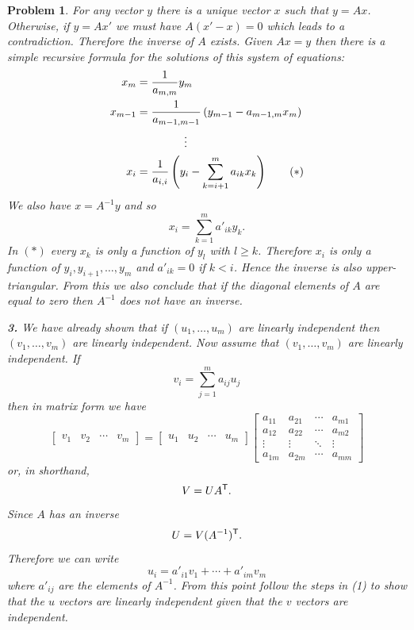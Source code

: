 \documentclass{article}
\theoremstyle{pprop}
\newtheorem{problem}{Problem}[section]
\begin{document}
\begin{problem}
For any vector $y$ there is a unique vector $x$ such that $y=Ax$. Otherwise, if $y=Ax'$ we must have $A(x'-x)=0$ 
which leads to a contradiction. Therefore the inverse of $A$ exists.
Given $Ax=y$ then there is a simple recursive formula for the solutions of this system of equations:
\begin{align*}
x_m &= \frac{1}{a_{m,m}}y_m \\
x_{m-1} & =\frac{1}{a_{m-1,m-1}} \left( y_{m-1}-a_{m-1,m} x_m \right) \\
& \kern10ex\vdots   \\
x_{i} &= \frac{1}{a_{i,i}} \left( y_i -  \sum_{k=i+1}^m a_{ik} x_k\right) \tag{$\ast$}
\end{align*}
We also have $x=A^{-1}y$ and so
$$
x_i = \sum_{k=1}^m a'_{ik} y_k.
$$
In $(\ast)$ every $x_k$ is only a function of $y_l$ with $l \geq k$. Therefore $x_i$ is only a function of 
$y_i, y_{i+1}, \ldots, y_m$ and $a'_{ik}=0$ if $k<i$. Hence the inverse is also upper-triangular. From this we also 
conclude that if the diagonal elements of $A$ are equal to zero then $A^{-1}$ does not have an inverse.
\par\noindent\textbf{3.} We have already shown that if $(u_1,\ldots,u_m)$ are linearly independent then $(v_1,\ldots,v_m)$ are 
linearly independent. Now assume that $(v_1,\ldots,v_m)$ are linearly independent. If 
$$
v_i = \sum_{j=1}^m a_{ij} u_j
$$
then in matrix form we have 
$$
\left[
\begin{array}{c|c|c|c} 
v_1 & v_2 & \cdots & v_m
\end{array}
\right]=
\left[
\begin{array}{c|c|c|c} 
u_1 & u_2 & \cdots & u_m
\end{array}
\right]
\begin{bmatrix}
a_{11} & a_{21} & \cdots & a_{m1} \\
a_{12} & a_{22} & \cdots & a_{m2}\\
\vdots & \vdots & \ddots & \vdots\\
a_{1m} & a_{2m} & \cdots & a_{mm}
\end{bmatrix}
$$
or, in shorthand,
$$
V = U A^{\sf T}.
$$
Since $A$ has an inverse 
$$
U = V (A^{-1})^{\sf T}.
$$
Therefore we can write 
$$
u_i = a'_{i1} v_1 + \cdots + a'_{im} v_m
$$
where $a'_{ij}$ are the elements of $A^{-1}$. From this point follow the steps in (1) to show that the $u$ vectors are 
linearly independent given that the $v$ vectors are independent.
\end{problem}
\end{document}
